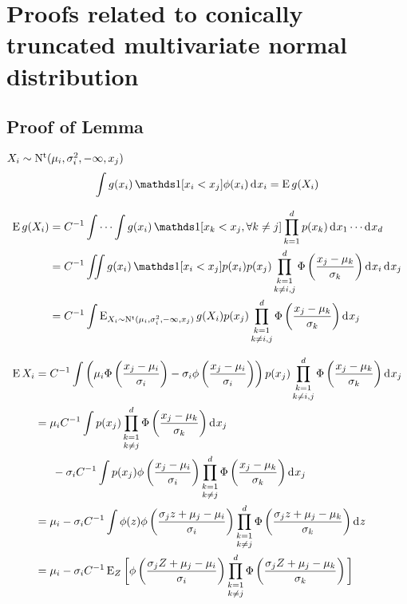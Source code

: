 \section{Proofs related to conically truncated multivariate normal distribution}

\subsection{Proof of Lemma}

$X_i \sim \operatorname{N^t}(\mu_i,\sigma_i^2,-\infty,x_j)$
\begin{align*}
  \int g(x_i) \ind[x_i < x_j] \phi(x_i) \dint x_i = \E g(X_i)
\end{align*}

\begin{align*}
  \E g(X_i)
  &= C^{-1} \idotsint  g(x_i) \ind[x_k < x_j, \forall k \neq j]  \prod_{k=1}^d p(x_k) \dint x_1 \cdots \dint x_d \\
  &= C^{-1} \iint g(x_i) \ind[x_i < x_j] p(x_i) p(x_j) \mathop{\prod_{k=1}^d}_{k \neq i,j} \Phi \left( \frac{x_j - \mu_k}{\sigma_k} \right)  \dint x_i \dint x_j \\
  &= C^{-1} \int \E_{X_i\sim\tN(\mu_i,\sigma_i^2,-\infty,x_j)} g(X_i) p(x_j) \mathop{\prod_{k=1}^d}_{k \neq i,j} \Phi \left( \frac{x_j - \mu_k}{\sigma_k} \right)  \dint x_j
  \end{align*}

\begin{align*}
  \operatorname{E} X_i 
  &= C^{-1} \int  \left(\mu_i \Phi \left( \frac{x_j-\mu_i}{\sigma_i}\right) - \sigma_i  \phi \left( \frac{x_j-\mu_i}{\sigma_i} \right) \right) p(x_j) \mathop{\prod_{k=1}^d}_{k \neq i,j} \Phi \left( \frac{x_j - \mu_k}{\sigma_k} \right)   \operatorname{d}\hspace{0.5pt}\! x_j \\
  &= \mu_i C^{-1} \int p(x_j) \mathop{\prod_{k=1}^d}_{k \neq j} \Phi \left( \frac{x_j - \mu_k}{\sigma_k} \right)   \operatorname{d}\hspace{0.5pt}\! x_j \\
  &\phantom{==} - \sigma_i C^{-1} \int p(x_j)  \phi \left( \frac{x_j-\mu_i}{\sigma_i} \right)  \mathop{\prod_{k=1}^d}_{k \neq j} \Phi \left( \frac{x_j - \mu_k}{\sigma_k} \right)   \operatorname{d}\hspace{0.5pt}\! x_j \\
  &= \mu_i - \sigma_i C^{-1} \int \phi(z)  \phi \left( \frac{\sigma_j z + \mu_j -\mu_i}{\sigma_i} \right)  \mathop{\prod_{k=1}^d}_{k \neq j} \Phi \left( \frac{\sigma_j z + \mu_j - \mu_k}{\sigma_k} \right)   \operatorname{d}\hspace{0.5pt}\! z \\
  &= \mu_i - \sigma_i C^{-1} \operatorname{E}_Z\bigg[ \phi \left( \frac{\sigma_j Z + \mu_j -\mu_i}{\sigma_i} \right)  \mathop{\prod_{k=1}^d}_{k \neq j} \Phi \left( \frac{\sigma_j Z + \mu_j - \mu_k}{\sigma_k} \right) \bigg]
\end{align*}

